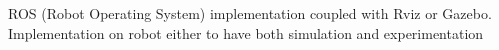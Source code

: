 \documentclass[../main.tex]{subfiles}
\begin{document}
ROS (Robot Operating System) implementation coupled with Rviz or Gazebo. 
Implementation on robot either to have both simulation and experimentation 
\end{document}
